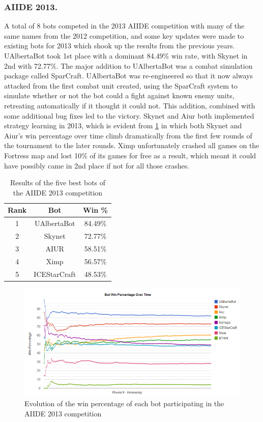 \documentclass{llncs}
\begin{document}
\subsubsection{AIIDE 2013.}

A total of 8 bots competed in the 2013 AIIDE competition with many of the same names from the 2012 competition, and some key updates were made to existing bots for 2013 which shook up the results from the previous years. UAlbertaBot took 1st place with a dominant 84.49\% win rate, with Skynet in 2nd with 72.77\%. The major addition to UAlbertaBot was a combat simulation package called SparCraft. UAlbertaBot was re-engineered so that it now always attacked from the first combat unit created, using the SparCraft system to simulate whether or not the bot could a fight against known enemy units, retreating automatically if it thought it could not. This addition, combined with some additional bug fixes led to the victory. Skynet and Aiur both implemented strategy learning in 2013, which is evident from \ref{fig:aiide2013} in which both Skynet and Aiur's win percentage over time climb dramatically from the first few rounds of the tournament to the later rounds. Ximp unfortunately crashed all games on the Fortress map and lost 10\% of its games for free as a result, which meant it could have possibly came in 2nd place if not for all those crashes. 

\begin{table}[!t]
\caption{Results of the five best bots of the AIIDE 2013 competition}
\label{tab:aiide2013}
\centering
\begin{tabular}{|c|c|c|}
\hline
{\bfseries Rank} & {\bfseries Bot} & {\bfseries Win \%} \\
\hline
1 & UAlbertaBot & 84.49\% \\
2 & Skynet & 72.77\% \\
3 & AIUR & 58.51\% \\
4 & Ximp & 56.57\% \\
5 & ICEStarCraft & 48.53\% \\
\hline
\end{tabular}
\end{table}

\begin{figure}[t!]
    \centering
    \includegraphics[width=\columnwidth]{figures/aiide2013}
    \caption{Evolution of the win percentage of each bot participating in the AIIDE 2013 competition}
    \label{fig:aiide2013}
\end{figure}
\end{document}
